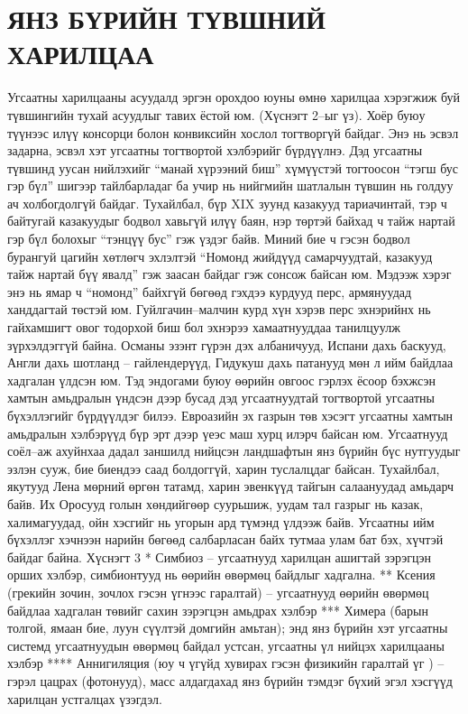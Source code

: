 \section{ЯНЗ БҮРИЙН ТҮВШНИЙ ХАРИЛЦАА}
Угсаатны харилцааны асуудалд эргэн орохдоо юуны өмнө харилцаа хэрэгжиж буй түвшингийн тухай асуудлыг тавих ёстой юм. (Хүснэгт 2–ыг үз). Хоёр буюу түүнээс илүү консорци болон конвиксийн хослол тогтворгүй байдаг. Энэ нь эсвэл задарна, эсвэл хэт угсаатны тогтвортой хэлбэрийг бүрдүүлнэ. Дэд угсаатны түвшинд уусан нийлэхийг “манай хүрээний биш” хүмүүстэй тогтоосон “тэгш бус гэр бүл” шигээр тайлбарладаг ба учир нь нийгмийн шатлалын түвшин нь голдуу ач холбогдолгүй байдаг. Тухайлбал, бүр XIX зуунд казакууд тариачинтай, тэр ч байтугай казакуудыг бодвол хавьгүй илүү баян, нэр төртэй байхад ч тайж нартай гэр бүл болохыг “тэнцүү бус” гэж үздэг байв. Миний бие ч гэсэн бодвол бурангуй цагийн хөтлөгч эхлэлтэй “Номонд жийдүүд самарчуудтай, казакууд тайж нартай бүү явалд” гэж заасан байдаг гэж сонсож байсан юм. Мэдээж хэрэг энэ нь ямар ч “номонд” байхгүй бөгөөд гэхдээ курдууд перс, армянуудад ханддагтай төстэй юм. Гуйлгачин–малчин курд хүн хэрэв перс эхнэрийнх нь гайхамшигт овог тодорхой биш бол эхнэрээ хамаатнууддаа танилцуулж зүрхэлдэггүй байна. Османы эзэнт гүрэн дэх албаничууд, Испани дахь баскууд, Англи дахь шотланд – гайлендерүүд, Гидукуш дахь патанууд мөн л ийм байдлаа хадгалан үлдсэн юм. Тэд эндогами буюу өөрийн овгоос гэрлэх ёсоор бэхжсэн хамтын амьдралын үндсэн дээр бусад дэд угсаатнуудтай тогтвортой угсаатны бүхэллэгийг бүрдүүлдэг билээ. Евроазийн эх газрын төв хэсэгт угсаатны хамтын амьдралын хэлбэрүүд бүр эрт дээр үеэс маш хурц илэрч байсан юм.
Угсаатнууд соёл–аж ахуйнхаа дадал заншилд нийцсэн ландшафтын янз бүрийн бүс нутгуудыг эзлэн сууж, бие биендээ саад болдоггүй, харин туслалцдаг байсан. Тухайлбал, якутууд Лена мөрний өргөн татамд, харин эвенкүүд тайгын салаануудад амьдарч байв. Их Оросууд голын хөндийгөөр суурьшиж, уудам тал газрыг нь казак, халимагуудад, ойн хэсгийг нь угорын ард түмэнд үлдээж байв. Угсаатны ийм бүхэллэг хэчнээн нарийн бөгөөд салбарласан байх тутмаа улам бат бэх, хүчтэй байдаг байна.
Хүснэгт 3
* Симбиоз – угсаатнууд харилцан ашигтай зэрэгцэн орших хэлбэр, симбионтууд нь өөрийн өвөрмөц байдлыг хадгална.
** Ксения (грекийн зочин, зочлох гэсэн үгнээс гаралтай) – угсаатнууд өөрийн өвөрмөц байдлаа хадгалан төвийг сахин зэрэгцэн амьдрах хэлбэр
*** Химера (барын толгой, ямаан бие, луун сүүлтэй домгийн амьтан); энд янз бүрийн хэт угсаатны системд угсаатнуудын өвөрмөц байдал устсан, угсаатны үл нийцэх харилцааны хэлбэр
**** Аннигиляция (юу ч үгүйд хувирах гэсэн физикийн гаралтай үг ) – гэрэл цацрах (фотонууд), масс алдагдахад янз бүрийн тэмдэг бүхий эгэл хэсгүүд харилцан устгалцах үзэгдэл.

